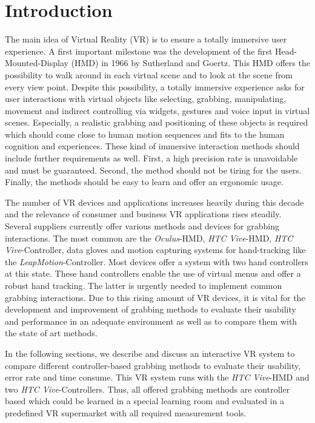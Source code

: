 \section{Introduction}\label{sec:Introduction}

The main idea of Virtual Reality (VR) is to ensure a totally immersive user experience. A first
important milestone was the development of the first Head-Mounted-Display (HMD) in 1966 by Sutherland and Goertz. This HMD offers the possibility to walk around in each virtual scene and to look at the scene from every view point. Despite this possibility, a totally immersive experience asks for user interactions with virtual objects like selecting, grabbing, manipulating, movement and indirect controlling via widgets, gestures and voice input in virtual scenes. Especially, a realistic grabbing and positioning of these objects is required which should come close to human motion sequences and fits to the human cognition and experiences. These kind of immersive interaction methods should include further requirements as well. First, a high precision rate is unavoidable and must be guaranteed. Second, the method should not be tiring for the users. Finally, the methods should be easy to learn and offer an ergonomic usage. 

The number of VR devices and applications increases heavily during this decade and the relevance of consumer and business VR applications rises steadily. Several suppliers currently offer various methods and devices for grabbing interactions. The most common are the \textit{Oculus}-HMD, \textit{HTC Vive}-HMD, \textit{HTC Vive}-Controller, data gloves and motion capturing systems for hand-tracking like the \textit{LeapMotion}-Controller. Most devices offer a system with two hand controllers at this state. These hand controllers enable the use of virtual menus and offer a robust hand tracking. The latter is urgently needed to implement common grabbing interactions. Due to this rising amount of VR devices, it is vital for the development and improvement of grabbing methods to evaluate their usability and performance in an adequate environment as well as to compare them with the state of art methods. 

In the following sections, we describe and discuss an interactive VR system to compare different controller-based grabbing methods to evaluate their usability, error rate and time consume. This VR system runs with the \textit{HTC Vive}-HMD and two \textit{HTC Vive}-Controllers. Thus, all offered grabbing methods are controller based which could be learned in a special learning room and evaluated in a predefined VR supermarket with all required measurement tools.


